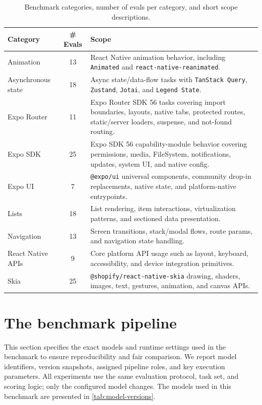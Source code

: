 \documentclass[11pt]{article}
\begin{document}
\begin{table}[htbp]
\centering
\small
\begin{tabularx}{\linewidth}{l c X}
\toprule
\textbf{Category} & \textbf{\# Evals} & \textbf{Scope} \\
\midrule
Animation & 13 & React Native animation behavior, including \texttt{Animated} and \texttt{react-native-reanimated}. \\
Asynchronous state & 18 & Async state/data-flow tasks with \texttt{TanStack Query}, \texttt{Zustand}, \texttt{Jotai}, and \texttt{Legend State}. \\
Expo Router & 11 & Expo Router SDK 56 tasks covering import boundaries, layouts, native tabs, protected routes, static/server loaders, suspense, and not-found routing. \\
Expo SDK & 25 & Expo SDK 56 capability-module behavior covering permissions, media, FileSystem, notifications, updates, system UI, and native config. \\
Expo UI & 7 & \texttt{@expo/ui} universal components, community drop-in replacements, native state, and platform-native entrypoints. \\
Lists & 18 & List rendering, item interactions, virtualization patterns, and sectioned data presentation. \\
Navigation & 13 & Screen transitions, stack/modal flows, route params, and navigation state handling. \\
React Native APIs & 9 & Core platform API usage such as layout, keyboard, accessibility, and device integration primitives. \\
Skia & 25 & \texttt{@shopify/react-native-skia} drawing, shaders, images, text, gestures, animation, and canvas APIs. \\
\bottomrule
\end{tabularx}
\caption{Benchmark categories, number of evals per category, and short scope descriptions.}
\label{tab:category-evals-scope}
\end{table}

\section{The benchmark pipeline}
\label{sec:pipeline}

This section specifies the exact models and runtime settings used in the benchmark to ensure reproducibility and fair comparison. We report model identifiers, version snapshots, assigned pipeline roles, and key execution parameters. All experiments use the same evaluation protocol, task set, and scoring logic; only the configured model changes.
The models used in this benchmark are presented in \cref{tab:model-versions}.
\end{document}
